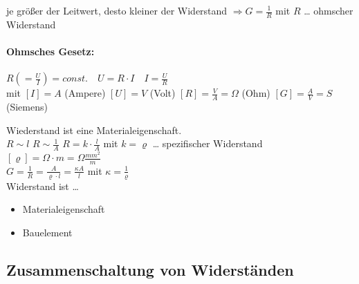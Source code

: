 je größer der Leitwert, desto kleiner der Widerstand $\Rightarrow G=\frac{1}{R}$ mit \quad $R$ … ohmscher Widerstand

\paragraph{Ohmsches Gesetz:}

$R\left(=\frac{U}{I}\right)=const. \quad U= R\cdot I \quad I = \frac{U}{R} $\\
mit $[I]=A$ (Ampere) \quad $[U]=V$ (Volt) \quad $[R]=\frac{V}{A}=\Omega$ (Ohm) \quad $[G]=\frac{A}{V} = S$ (Siemens)

Wiederstand ist eine Materialeigenschaft.\\
$R \sim l$ \quad $R\sim \frac{1}{A}$ \quad $R=k \cdot \frac{l}{A}$ mit  \quad $k=\varrho$ … spezifischer Widerstand $[\varrho]=\Omega \cdot m = \Omega \frac{mm^2}{m}$\\
$G=\frac{1}{R}=\frac{A}{\varrho \cdot l}=\frac{\kappa A}{l}$ mit \quad $\kappa = \frac{1}{\varrho}$\smallskip\\
Widerstand ist …
\begin{itemize}
\item Materialeigenschaft
\item Bauelement \\
\end{itemize}

\subsection{Zusammenschaltung von Widerständen}

